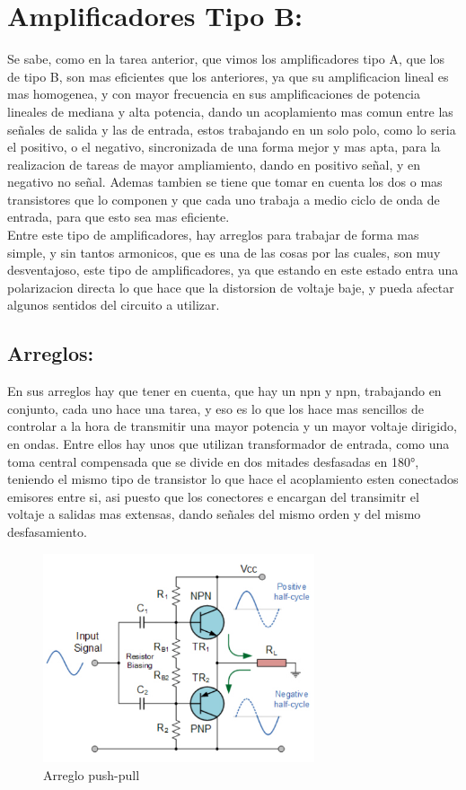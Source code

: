 \documentclass[12pt,a4paper]{article}
\begin{document}
\section{Amplificadores Tipo B:}
Se sabe, como en la tarea anterior, que vimos los amplificadores tipo A, que los de tipo B, son mas eficientes que los anteriores, ya que su amplificacion lineal es mas homogenea, y con mayor frecuencia en sus amplificaciones de potencia lineales de mediana y alta potencia, dando un acoplamiento mas comun entre las señales de salida y las de entrada, estos trabajando en un solo polo, como lo seria el positivo, o el negativo, sincronizada de una forma mejor y mas apta, para la realizacion de tareas de mayor ampliamiento, dando en positivo señal, y en negativo no señal. Ademas tambien se tiene que tomar en cuenta los dos o mas transistores que lo componen y que cada uno trabaja a medio ciclo de onda de entrada, para que esto sea mas eficiente.\\

Entre este tipo de amplificadores, hay arreglos para trabajar de forma mas simple, y sin tantos armonicos, que es una de las cosas por las cuales, son muy desventajoso, este tipo de amplificadores, ya que estando en este estado entra una polarizacion directa lo que hace que la distorsion de voltaje baje, y pueda afectar algunos sentidos del circuito a utilizar.\\

\subsection{Arreglos:}

En sus arreglos hay que tener en cuenta, que hay un npn y npn, trabajando en conjunto, cada uno hace una tarea, y eso es lo que los hace mas sencillos de controlar a la hora de transmitir una mayor potencia y un mayor voltaje dirigido, en ondas. Entre ellos hay unos que utilizan transformador de entrada, como una toma central compensada que se divide en dos mitades desfasadas en 180°, teniendo el mismo tipo de transistor lo que hace el acoplamiento esten conectados emisores entre si, asi puesto que los conectores e encargan del transimitr el voltaje a salidas mas extensas, dando señales del mismo orden y del mismo desfasamiento.\\

\begin{figure}[hbtp]
\centering
\includegraphics[width=8cm]{clase B.jpg}
\caption{Arreglo push-pull}
\end{figure}
\end{document}
